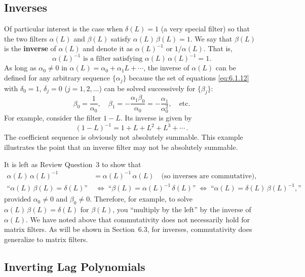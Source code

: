 \subsection*{Inverses}

Of particular interest is the case when $\delta(L) = 1$ (a very special filter) so that the
two filters $\alpha(L)$ and $\beta(L)$ satisfy $\alpha(L)\,\beta(L) = 1$. We say that $\beta(L)$ is the \textbf{inverse}
of $\alpha(L)$ and denote it as $\alpha(L)^{-1}$ or $1/\alpha(L)$. That is,
\begin{equation}
  \alpha(L)^{-1} \text{ is a filter satisfying } \alpha(L)\,\alpha(L)^{-1} = 1.
  \label{eq:6.1.14}
\end{equation}
As long as $\alpha_0 \neq 0$ in $\alpha(L) = \alpha_0 + \alpha_1 L + \cdots$, the inverse of $\alpha(L)$ can be defined
for any arbitrary sequence $\{\alpha_j\}$ because the set of equations \eqref{eq:6.1.12} with $\delta_0 = 1$,
$\delta_j = 0$ ($j = 1, 2, \ldots$) can be solved successively for $\{\beta_j\}$:
\[
  \beta_0 = \frac{1}{\alpha_0}, \quad
  \beta_1 = -\frac{\alpha_1 \beta_0}{\alpha_0} = -\frac{\alpha_1}{\alpha_0^2}, \quad \text{etc.}
\]
For example, consider the filter $1 - L$. Its inverse is given by
\[
  (1 - L)^{-1} = 1 + L + L^2 + L^3 + \cdots\,.
\]
The coefficient sequence is obviously not absolutely summable. This example
illustrates the point that an inverse filter may not be absolutely summable.

It is left as Review Question~3 to show that
\begin{align}
  \alpha(L)\,\alpha(L)^{-1} &= \alpha(L)^{-1}\,\alpha(L)
  \quad \text{(so inverses are commutative),}
  \label{eq:6.1.15a} \\[4pt]
  \text{``}\alpha(L)\,\beta(L) = \delta(L)\text{''} &\;\Leftrightarrow\;
  \text{``}\beta(L) = \alpha(L)^{-1}\,\delta(L)\text{''} \;\Leftrightarrow\;
  \text{``}\alpha(L) = \delta(L)\,\beta(L)^{-1},\text{''}
  \label{eq:6.1.15b}
\end{align}
provided $\alpha_0 \neq 0$ and $\beta_0 \neq 0$. Therefore, for example, to solve $\alpha(L)\,\beta(L) = \delta(L)$
for $\beta(L)$, you ``multiply by the left'' by the inverse of $\alpha(L)$. We have noted above
that commutativity does not necessarily hold for matrix filters. As will be shown
in Section~6.3, for inverses, commutativity does generalize to matrix filters.

\subsection*{Inverting Lag Polynomials}

